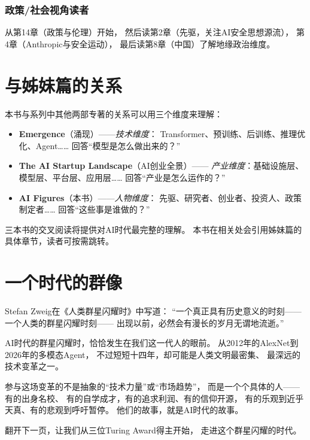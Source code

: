 \subsubsection{政策/社会视角读者}
从第14章（政策与伦理）开始，
然后读第2章（先驱，关注AI安全思想源流），
第4章（Anthropic与安全运动），
最后读第8章（中国）了解地缘政治维度。


\section{与姊妹篇的关系}
\label{sec:overview-siblings}

本书与系列中其他两部专著的关系可以用三个维度来理解：

\begin{keybox}
\begin{itemize}
  \item \textbf{Emergence}（涌现）——\textit{技术维度}：
    Transformer、预训练、后训练、推理优化、Agent……
    回答``模型是怎么做出来的？''
  \item \textbf{The AI Startup Landscape}（AI创业全景）——
    \textit{产业维度}：基础设施层、模型层、平台层、应用层……
    回答``产业是怎么运作的？''
  \item \textbf{AI Figures}（本书）——\textit{人物维度}：
    先驱、研究者、创业者、投资人、政策制定者……
    回答``这些事是谁做的？''
\end{itemize}
三本书的交叉阅读将提供对AI时代最完整的理解。
本书在相关处会引用姊妹篇的具体章节，读者可按需跳转。
\end{keybox}


\section{一个时代的群像}
\label{sec:overview-closing}

Stefan Zweig在《人类群星闪耀时》中写道：
``一个真正具有历史意义的时刻——一个人类的群星闪耀时刻——
出现以前，必然会有漫长的岁月无谓地流逝。''

AI时代的群星闪耀时，恰恰发生在我们这一代人的眼前。
从2012年的AlexNet到2026年的多模态Agent，
不过短短十四年，却可能是人类文明最密集、
最深远的技术变革之一。

参与这场变革的不是抽象的``技术力量''或``市场趋势''，
而是一个个具体的人——有的出身名校、
有的自学成才，有的追求利润、有的信仰开源，
有的乐观到近乎天真、有的悲观到呼吁暂停。
他们的故事，就是AI时代的故事。

翻开下一页，让我们从三位Turing Award得主开始，
走进这个群星闪耀的时代。
